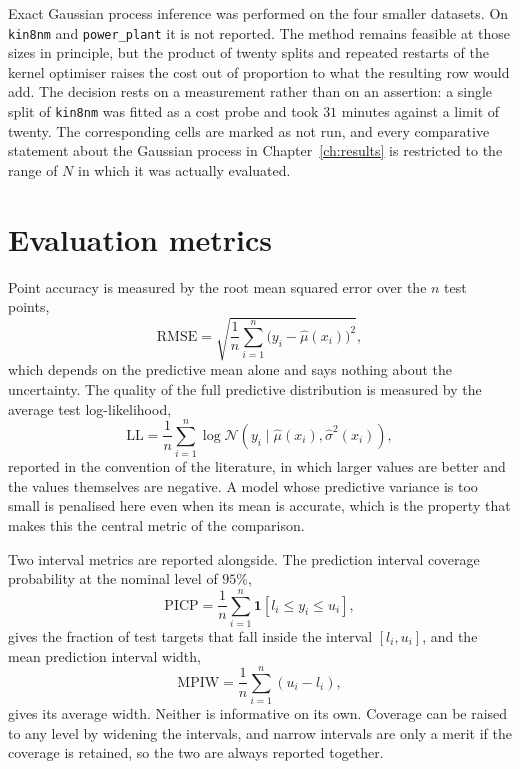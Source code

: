 Exact Gaussian process inference was performed on the four smaller datasets. On
\texttt{kin8nm} and \texttt{power\_plant} it is not reported. The method remains
feasible at those sizes in principle, but the product of twenty splits and repeated
restarts of the kernel optimiser raises the cost out of proportion to what the
resulting row would add. The decision rests on a measurement rather than on an
assertion: a single split of \texttt{kin8nm} was fitted as a cost probe and took
$31$ minutes against a limit of twenty. The corresponding cells are marked as not run, and every
comparative statement about the Gaussian process in Chapter~\ref{ch:results} is
restricted to the range of $N$ in which it was actually evaluated.

\section{Evaluation metrics}
\label{sec:metrics}

Point accuracy is measured by the root mean squared error over the $n$ test points,
%
\begin{equation}
    \mathrm{RMSE} = \sqrt{\frac{1}{n} \sum_{i=1}^{n} \bigl(y_i - \hat{\mu}(x_i)\bigr)^2 } ,
    \label{eq:rmse}
\end{equation}
%
which depends on the predictive mean alone and says nothing about the uncertainty. The
quality of the full predictive distribution is measured by the average test
log-likelihood,
%
\begin{equation}
    \mathrm{LL} = \frac{1}{n} \sum_{i=1}^{n}
      \log \mathcal{N}\!\left(y_i \mid \hat{\mu}(x_i), \hat{\sigma}^2(x_i)\right) ,
    \label{eq:ll}
\end{equation}
%
reported in the convention of the literature, in which larger values are better and the
values themselves are negative. A model whose predictive variance is too small is
penalised here even when its mean is accurate, which is the property that makes this
the central metric of the comparison.

Two interval metrics are reported alongside. The prediction interval coverage
probability at the nominal level of $95\%$,
%
\begin{equation}
    \mathrm{PICP} = \frac{1}{n} \sum_{i=1}^{n}
      \mathbf{1}\!\left[ l_i \le y_i \le u_i \right] ,
    \label{eq:picp}
\end{equation}
%
gives the fraction of test targets that fall inside the interval $[l_i, u_i]$, and the
mean prediction interval width,
%
\begin{equation}
    \mathrm{MPIW} = \frac{1}{n} \sum_{i=1}^{n} (u_i - l_i) ,
    \label{eq:mpiw}
\end{equation}
%
gives its average width. Neither is informative on its own. Coverage can be raised to
any level by widening the intervals, and narrow intervals are only a merit if the
coverage is retained, so the two are always reported together.

